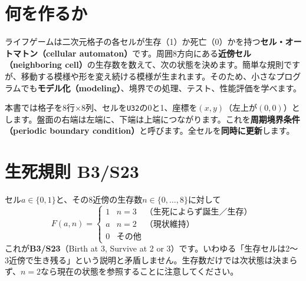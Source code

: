 \documentclass[11pt,a4paper,openany]{book}
\newcommand{\code}[1]{\texttt{#1}}
\newcommand{\term}[1]{\textbf{#1}}
\begin{document}
\section{何を作るか}
ライフゲームは二次元格子の各セルが生存（1）か死亡（0）かを持つ\term{セル・オートマトン（cellular automaton）}です。周囲8方向にある\term{近傍セル（neighboring cell）}の生存数を数えて、次の状態を決めます。簡単な規則ですが、移動する模様や形を変え続ける模様が生まれます。そのため、小さなプログラムでも\term{モデル化（modeling）}、境界での処理、テスト、性能評価を学べます。

本書では格子を8行×8列、セルを\code{U32}の0と1、座標を\((x,y)\)（左上が\((0,0)\)）とします。盤面の右端は左端に、下端は上端につながります。これを\term{周期境界条件（periodic boundary condition）}と呼びます。全セルを\textbf{同時に更新}します。

\section{生死規則 B3/S23}
セル\(a\in\{0,1\}\)と、その8近傍の生存数\(n\in\{0,\ldots,8\}\)に対して
\[
F(a,n)=\begin{cases}
1&n=3\quad\text{（生死によらず誕生／生存）}\\
a&n=2\quad\text{（現状維持）}\\0&\text{その他}
\end{cases}
\]
これが\textbf{B3/S23}（Birth at 3, Survive at 2 or 3）です。いわゆる「生存セルは2～3近傍で生き残る」という説明と矛盾しません。生存数だけでは次状態は決まらず、\(n=2\)なら現在の状態を参照することに注意してください。

\begin{center}
\end{center}
\end{document}

